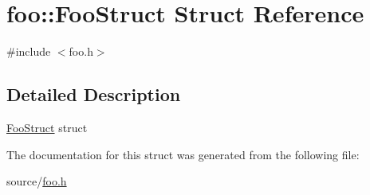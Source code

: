 \hypertarget{structfoo_1_1FooStruct}{}\section{foo\+:\+:Foo\+Struct Struct Reference}
\label{structfoo_1_1FooStruct}


{\ttfamily \#include $<$foo.\+h$>$}



\subsection{Detailed Description}
\hyperlink{structfoo_1_1FooStruct}{Foo\+Struct} struct 

The documentation for this struct was generated from the following file\+:\begin{DoxyCompactItemize}
\item 
source/\hyperlink{foo_8h}{foo.\+h}\end{DoxyCompactItemize}
